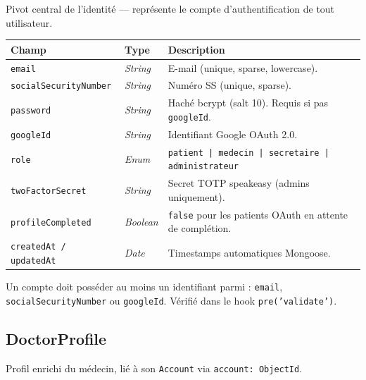 \documentclass[12pt,a4paper]{report}
\newcommand{\field}[1]{\texttt{\small\textcolor{MedTealDark}{#1}}}
\newcommand{\typ}[1]{\textit{\small\textcolor{CommentGray}{#1}}}
\begin{document}
Pivot central de l'identité — représente le compte d'authentification de tout utilisateur.

\begin{center}
\small
\begin{tabularx}{\textwidth}{@{} l l X @{}}
  \toprule
  \textbf{Champ} & \textbf{Type} & \textbf{Description} \\
  \midrule
  \field{email}               & \typ{String}  & E-mail (unique, sparse, lowercase). \\
  \field{socialSecurityNumber}& \typ{String}  & Numéro SS (unique, sparse). \\
  \field{password}            & \typ{String}  & Haché bcrypt (salt 10). Requis si pas \texttt{googleId}. \\
  \field{googleId}            & \typ{String}  & Identifiant Google OAuth 2.0. \\
  \field{role}                & \typ{Enum}    & \texttt{patient | medecin | secretaire | administrateur} \\
  \field{twoFactorSecret}     & \typ{String}  & Secret TOTP speakeasy (admins uniquement). \\
  \field{profileCompleted}    & \typ{Boolean} & \texttt{false} pour les patients OAuth en attente de complétion. \\
  \field{createdAt / updatedAt}& \typ{Date}   & Timestamps automatiques Mongoose. \\
  \bottomrule
\end{tabularx}
\end{center}

\begin{infobox}[title=Contrainte d'identifiant]
  Un compte doit posséder au moins un identifiant parmi : \texttt{email}, \texttt{socialSecurityNumber} ou \texttt{googleId}. Vérifié dans le hook \texttt{pre('validate')}.
\end{infobox}

\subsection{DoctorProfile}

Profil enrichi du médecin, lié à son \texttt{Account} via \texttt{account: ObjectId}.
\end{document}
